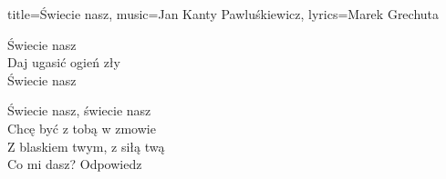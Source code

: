 \begin{song}{title={Świecie nasz}, music={Jan Kanty Pawluśkiewicz}, lyrics={Marek Grechuta}}
\begin{multicols}{2}
\begin{chorus}
        Świecie nasz \\
        Daj ugasić ogień zły \\
        Świecie nasz
    \end{chorus}
    \begin{outro}
        Świecie nasz, świecie nasz \\
        Chcę być z tobą w zmowie \\
        Z blaskiem twym, z siłą twą \\
        Co mi dasz? Odpowiedz
    \end{outro}
    \end{multicols}
\end{song}

